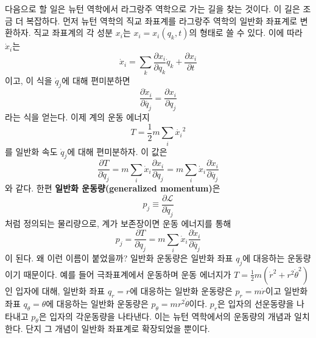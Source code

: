 \documentclass[chapter, oneside, b5paper]{oblivoir}
\theoremstyle{plain}
\theoremstyle{definition}
\theoremstyle{remark}
\begin{document}
다음으로 할 일은 뉴턴 역학에서 라그랑주 역학으로 가는 길을 찾는 것이다. 이 길은 조금 더 복잡하다. 먼저 뉴턴 역학의 직교 좌표계를 라그랑주 역학의 일반화 좌표계로 변환하자. 직교 좌표계의 각 성분 $x_i$는 $x_i = x_i(q_k, t)$의 형태로 쓸 수 있다. 이에 따라 $\dot{x}_i$는
\begin{equation}
    \dot{x}_i = \sum_k \frac{\partial x_i}{\partial q_k}\dot{q}_k + \frac{\partial x_i}{\partial t} \label{eq:6.46}
\end{equation}
이고, 이 식을 $\dot{q}_j$에 대해 편미분하면
\begin{equation}
    \frac{\partial \dot{x}_i}{\partial \dot{q_j}} = \frac{\partial x_i}{\partial q_j} \label{eq:6.47}
\end{equation}
라는 식을 얻는다. 이제 계의 운동 에너지
\begin{equation}
    T = \frac{1}{2}m\sum_i \dot{x_i}^2 \label{eq:6.48}
\end{equation}
를 일반화 속도 $\dot{q}_j$에 대해 편미분하자. 이 값은
\begin{equation}
    \frac{\partial T}{\partial \dot{q}_j} = m\sum_i \dot{x}_i\frac{\partial x_i}{\partial q_j} = m\sum_i \dot{x}_i\frac{\partial \dot{x}_i}{\partial \dot{q_j}} \label{eq:6.49}
\end{equation}
와 같다. 한편 \textbf{일반화 운동량(generalized momentum)}은
\begin{equation}
    p_j \equiv \frac{\partial \mathcal{L}}{\partial \dot{q}_j} \label{eq:6.50}
\end{equation}
처럼 정의되는 물리량으로, 계가 보존장이면 운동 에너지를 통해
\begin{equation}
    p_j = \frac{\partial T}{\partial \dot{q}_j} = m\sum_i \dot{x}_i\frac{\partial \dot{x}_i}{\partial \dot{q_j}} \label{eq:6.51}
\end{equation}
이 된다. 왜 이런 이름이 붙었을까? 일반화 운동량은 일반화 좌표 $q_j$에 대응하는 운동량이기 때문이다. 예를 들어 극좌표계에서 운동하며 운동 에너지가 $T = \frac{1}{2}m(\dot{r}^2 + r^2\dot{\theta}^2)$인 입자에 대해, 일반화 좌표 $q_r = r$에 대응하는 일반화 운동량은 $p_r = m\dot{r}$이고 일반화 좌표 $q_\theta = \theta$에 대응하는 일반화 운동량은 $p_\theta = mr^2\dot{\theta}$이다. $p_r$은 입자의 선운동량을 나타내고 $p_\theta$은 입자의 각운동량을 나타낸다. 이는 뉴턴 역학에서의 운동량의 개념과 일치한다. 단지 그 개념이 일반화 좌표계로 확장되었을 뿐이다.
\end{document}
